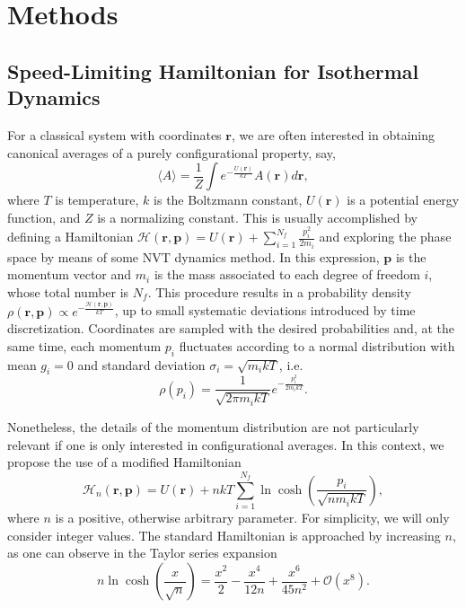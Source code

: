 \documentclass[
aip,
jcp,
reprint,
]{revtex4-1}
\newcommand{\vt}[1]{\boldsymbol{\mathbf{#1}}}          %
\newcommand{\nn}{n}
\begin{document}
\section{Methods}

\subsection{Speed-Limiting Hamiltonian for Isothermal Dynamics}

For a classical system with coordinates $\vt r$, we are often interested in obtaining canonical averages of a purely configurational property, say,
\begin{equation}
\label{eq:configurational average}
\langle A \rangle = \frac{1}{Z} \int e^{-\frac{U(\vt r)}{kT}} A(\vt r) d\vt r,
\end{equation}
where $T$ is temperature, $k$ is the Boltzmann constant, $U(\vt r)$ is a potential energy function, and $Z$ is a normalizing constant.
This is usually accomplished by defining a Hamiltonian $\mathcal{H}(\vt r, \vt p) = U(\vt r) + \sum_{i=1}^{N_f} \frac{p_i^2}{2 m_i}$ and exploring the phase space by means of some NVT dynamics method.
In this expression, $\vt p$ is the momentum vector and $m_i$ is the mass associated to each degree of freedom $i$, whose total number is $N_f$.
This procedure results in a probability density $\rho(\vt r, \vt p) \propto e^{-\frac{\mathcal{H}(\vt r, \vt p)}{kT}}$, up to small systematic deviations introduced by time discretization.
Coordinates are sampled with the desired probabilities and, at the same time, each momentum $p_i$ fluctuates according to a normal distribution with mean $g_i = 0$ and standard deviation $\sigma_i = \sqrt{m_i k T}$, i.e.
\begin{equation}
\label{eq:gaussian momentum distribution}
\rho(p_i) = \frac{1}{\sqrt{2 \pi m_i k T}} e^{-\frac{p_i^2}{2 m_i k T}}.
\end{equation}

Nonetheless, the details of the momentum distribution are not particularly relevant if one is only interested in configurational averages.
In this context, we propose the use of a modified Hamiltonian
\begin{equation}
\label{eq:modified hamiltonian}
\mathcal{H}_n(\vt r, \vt p) = U(\vt r) + \nn kT \sum_{i=1}^{N_f} \ln \cosh\left(\frac{p_i}{\sqrt{\nn m_i k T}}\right),
\end{equation}
where $\nn$ is a positive, otherwise arbitrary parameter.
For simplicity, we will only consider integer values.
The standard Hamiltonian is approached by increasing $\nn$, as one can observe in the Taylor series expansion
\begin{equation*}
\nn \ln \cosh \left(\frac{x}{\sqrt{\nn}}\right) = \frac{x^2}{2} - \frac{x^4}{12 \nn} + \frac{x^6}{45 \nn^2} + \mathcal{O}(x^8).
\end{equation*}
\end{document}
